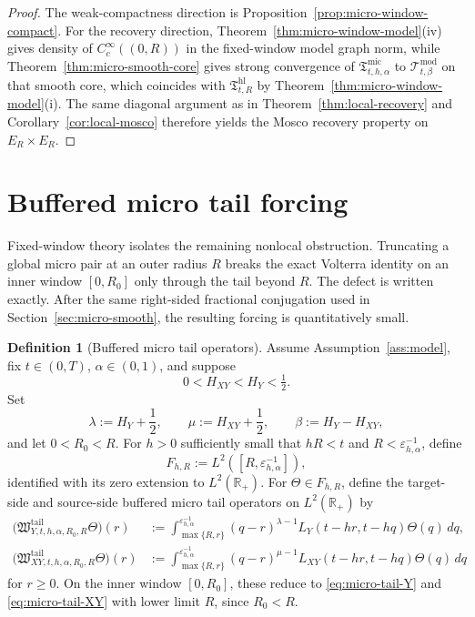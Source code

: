 \documentclass[11pt,a4paper]{amsart}
\theoremstyle{plain}
\theoremstyle{definition}
\newtheorem{definition}[theorem]{Definition}
\theoremstyle{remark}
\newcommand{\R}{\mathbb{R}}
\begin{document}
\begin{proof}
The weak-compactness direction is Proposition~\ref{prop:micro-window-compact}. For the recovery
direction, Theorem~\ref{thm:micro-window-model}(iv) gives density of \(C_c^\infty((0,R))\) in the
fixed-window model graph norm, while Theorem~\ref{thm:micro-smooth-core} gives strong convergence
of \(\mathfrak T_{t,h,\alpha}^{\mathrm{mic}}\) to \(\mathcal T_{t,\beta}^{\mathrm{mod}}\) on that
smooth core, which coincides with \(\mathfrak T_{t,R}^{\mathrm{hl}}\) by
Theorem~\ref{thm:micro-window-model}(i). The same diagonal argument as in
Theorem~\ref{thm:local-recovery} and Corollary~\ref{cor:local-mosco} therefore yields the Mosco
recovery property on \(E_R\times E_R\).
\end{proof}

\section{Buffered micro tail forcing}\label{sec:micro-tail}

Fixed-window theory isolates the remaining nonlocal obstruction.  Truncating a global micro pair at
an outer radius \(R\) breaks the exact Volterra identity on an inner window \([0,R_0]\) only through
the tail beyond \(R\).  The defect is written exactly.  After the same right-sided fractional
conjugation used in Section~\ref{sec:micro-smooth}, the resulting forcing is quantitatively small.

\begin{definition}[Buffered micro tail operators]
\label{def:micro-tail}
Assume Assumption~\ref{ass:model}, fix \(t\in(0,T)\), \(\alpha\in(0,1)\), and suppose
\[
0<H_{XY}<H_Y<\tfrac12.
\]
Set
\[
\lambda:=H_Y+\frac12,
\qquad
\mu:=H_{XY}+\frac12,
\qquad
\beta:=H_Y-H_{XY},
\]
and let \(0<R_0<R\). For \(h>0\) sufficiently small that \(hR<t\) and
\(R<\varepsilon_{h,\alpha}^{-1}\), define
\[
F_{h,R}:=L^2([R,\varepsilon_{h,\alpha}^{-1}]),
\]
identified with its zero extension to \(L^2(\R_+)\). For \(\Theta\in F_{h,R}\), define the
target-side and source-side buffered micro tail operators on \(L^2(\R_+)\) by
\begin{align}
\bigl(
\mathfrak W_{Y,t,h,\alpha,R_0,R}^{\mathrm{tail}}\Theta
\bigr)(r)
&:=
\int_{\max\{R,r\}}^{\varepsilon_{h,\alpha}^{-1}}
(q-r)^{\lambda-1}
L_Y(t-hr,t-hq)\Theta(q)\,dq,
\label{eq:micro-tail-Y}\\
\bigl(
\mathfrak W_{XY,t,h,\alpha,R_0,R}^{\mathrm{tail}}\Theta
\bigr)(r)
&:=
\int_{\max\{R,r\}}^{\varepsilon_{h,\alpha}^{-1}}
(q-r)^{\mu-1}
L_{XY}(t-hr,t-hq)\Theta(q)\,dq
\label{eq:micro-tail-XY}
\end{align}
for \(r\ge0\). On the inner window \([0,R_0]\), these reduce to \eqref{eq:micro-tail-Y} and
\eqref{eq:micro-tail-XY} with lower limit \(R\), since \(R_0<R\).
\end{definition}
\end{document}
